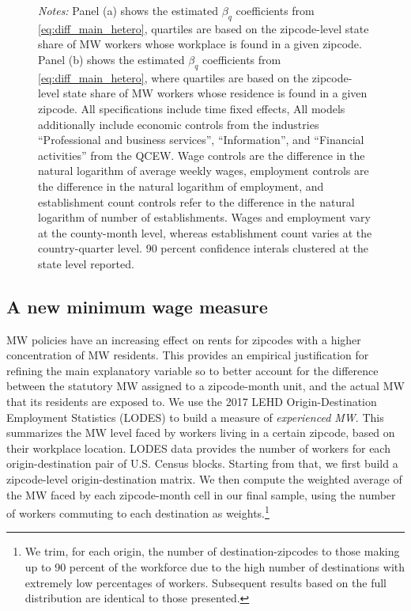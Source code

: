 \begin{figure}[htb!]
\begin{subfigure}[b]{\textwidth}
	\end{subfigure}
	\begin{minipage}{\textwidth}\footnotesize
		\vspace{3mm}	
		\textit{Notes:} Panel (a) shows the estimated $\beta_q$ coefficients from \autoref{eq:diff_main_hetero},  quartiles are 
		based on the zipcode-level state share of MW workers whose workplace is found in a given zipcode. 
		Panel (b) shows the estimated $\beta_q$ coefficients from \autoref{eq:diff_main_hetero}, where quartiles are 
		based on the zipcode-level state share of MW workers whose residence is found in a given zipcode. 
		All specifications include time fixed effects, 
		All models additionally  
		include economic controls from the industries ``Professional and business services'', 
		``Information'', and ``Financial activities'' from the QCEW. Wage controls are 
		the difference in the natural logarithm of average weekly wages, employment 
		controls are the difference in the natural logarithm of employment, and 
		establishment count controls refer to the difference in the natural logarithm 
		of number of establishments. Wages and employment vary at the county-month level,
		whereas establishment count varies at the country-quarter level.
		90 percent confidence interals clustered at the state level reported. 
	\end{minipage}
\end{figure}



\subsection{A new minimum wage measure}
MW policies have an increasing effect on rents for zipcodes with a higher concentration of MW residents. 
This provides an empirical justification for refining the main explanatory variable so to better account for 
the difference between the statutory MW assigned to a zipcode-month unit, and the actual MW that its 
residents are exposed to. We use the 2017 LEHD Origin-Destination Employment Statistics (LODES) to 
build a measure of \textit{experienced MW}. This summarizes the MW level faced by workers living in a certain zipcode, 
based on their workplace location. LODES data provides the number of workers for each origin-destination 
pair of U.S. Census blocks. Starting from that, we first build a zipcode-level origin-destination matrix. 
We then compute the weighted average of the MW faced by each zipcode-month cell in our final sample, 
using the number of workers commuting to each destination as weights.\footnote{We trim, for each 
	origin, the number of destination-zipcodes to those making up to 90 percent of the workforce due to 
	the high number of destinations with extremely low percentages of workers. Subsequent results 
	based on the full distribution are identical to those presented.} 

